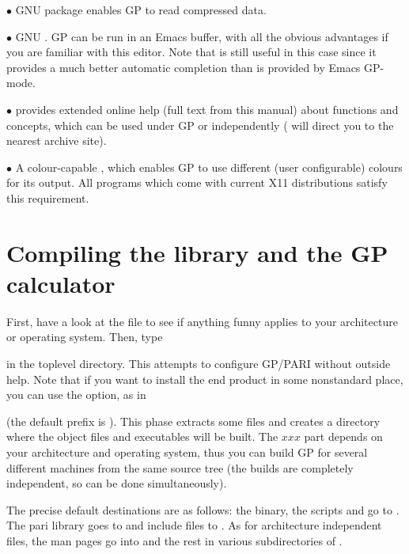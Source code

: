   $\bullet$ GNU  package enables GP to read
compressed data.

  $\bullet$ GNU . GP can be run in an Emacs buffer, with all the
obvious advantages if you are familiar with this editor. Note that
 is still useful in this case since it provides a much better
automatic completion than is provided by Emacs GP-mode.

  $\bullet$  provides extended online help (full text from this
manual) about functions and concepts, which can be used under GP or
independently ( will direct you to the nearest
 archive site).

  $\bullet$ A colour-capable , which enables GP to use different
(user configurable) colours for its output. All  programs which
come with current X11 distributions satisfy this requirement.
\vfill\eject
\section{Compiling the library and the GP calculator}

 First, have a look at the  file
to see if anything funny applies to your architecture or operating system.
Then, type 


\noindent in the toplevel directory. This attempts to configure GP/PARI
without outside help. Note that if you want to install the end product in
some nonstandard place, you can use the  option, as in


\noindent (the default prefix is ). This phase extracts some
files and creates a directory  where the object files and
executables will be built. The $xxx$ part depends on your architecture and
operating system, thus you can build GP for several different machines from
the same source tree (the builds are completely independent, so can be done
simultaneously).

 The precise default destinations are as follows:
the  binary, the scripts  and  go to
. The pari library goes to  and include
files to . As for architecture independent files,
the man pages go into  and the rest in various
subdirectories of .

